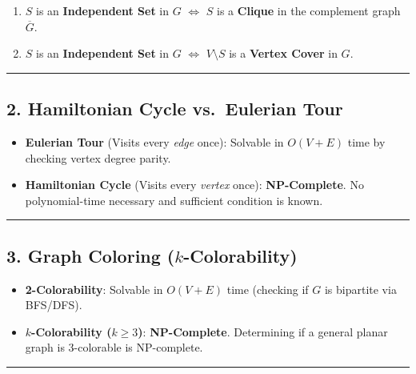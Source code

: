 \documentclass[
]{book}
\providecommand{\tightlist}{%
  \setlength{\itemsep}{0pt}\setlength{\parskip}{0pt}}
\theoremstyle{definition}
\theoremstyle{definition}
\theoremstyle{definition}
\theoremstyle{definition}
\theoremstyle{remark}
\begin{document}
\begin{enumerate}
\def\labelenumi{\arabic{enumi}.}
\tightlist
\item
  \(S\) is an \textbf{Independent Set} in \(G\) \(\iff\) \(S\) is a \textbf{Clique} in the complement graph \(\overline{G}\).
\item
  \(S\) is an \textbf{Independent Set} in \(G\) \(\iff\) \(V \setminus S\) is a \textbf{Vertex Cover} in \(G\).
\end{enumerate}

\begin{center}\rule{0.5\linewidth}{0.5pt}\end{center}

\subsection{2. Hamiltonian Cycle vs.~Eulerian Tour}\label{hamiltonian-cycle-vs.-eulerian-tour}

\begin{itemize}
\tightlist
\item
  \textbf{Eulerian Tour} (Visits every \emph{edge} once): Solvable in \(O(V + E)\) time by checking vertex degree parity.
\item
  \textbf{Hamiltonian Cycle} (Visits every \emph{vertex} once): \textbf{NP-Complete}. No polynomial-time necessary and sufficient condition is known.
\end{itemize}

\begin{center}\rule{0.5\linewidth}{0.5pt}\end{center}

\subsection{\texorpdfstring{3. Graph Coloring (\(k\)-Colorability)}{3. Graph Coloring (k-Colorability)}}\label{graph-coloring-k-colorability}

\begin{itemize}
\tightlist
\item
  \textbf{2-Colorability}: Solvable in \(O(V + E)\) time (checking if \(G\) is bipartite via BFS/DFS).
\item
  \textbf{\(k\)-Colorability (\(k \ge 3\))}: \textbf{NP-Complete}. Determining if a general planar graph is 3-colorable is NP-complete.
\end{itemize}

\begin{center}\rule{0.5\linewidth}{0.5pt}\end{center}
\end{document}
